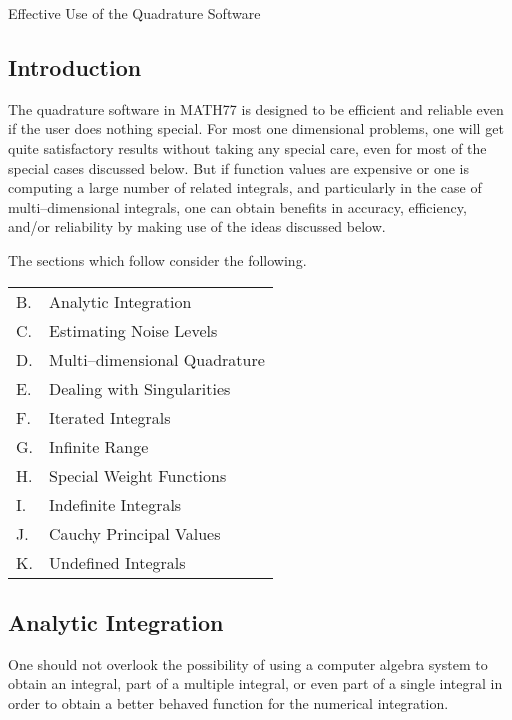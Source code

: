 \documentclass[twoside]{MATH77}
\begin{document}
 Effective Use of the Quadrature Software


\subsection{Introduction}

The quadrature software in MATH77 is designed to be efficient and
reliable even if the user does nothing special.  For most one
dimensional problems, one will get quite satisfactory results without
taking any special care, even for most of the special cases discussed
below.  But if function values are expensive or one is computing a
large number of related integrals, and particularly in the case of
multi--dimensional integrals, one can obtain benefits in accuracy,
efficiency, and/or reliability by making use of the ideas discussed
below.

The sections which follow consider the following.

\begin{tabular}{l@{~~}p{2.5in}}
B. & Analytic Integration \dotfill \pageref{analytic}\\
C. & Estimating Noise Levels \dotfill \pageref{noise}\\
D. & Multi--dimensional Quadrature \dotfill \pageref{multi_dim}\\
E. & Dealing with Singularities \dotfill \pageref{sing}\\
F. & Iterated Integrals \dotfill \pageref{iter}\\
G. & Infinite Range \dotfill \pageref{infinite}\\
H. & Special Weight Functions \dotfill \pageref{weight}\\
I. & Indefinite Integrals \dotfill \pageref{indefinite}\\
J. & Cauchy Principal Values \dotfill \pageref{cauchy}\\
K. & Undefined Integrals \dotfill \pageref{undefined}
\end{tabular}

\subsection{Analytic Integration}\label{analytic}
One should not overlook the possibility of using a computer algebra
system to obtain an integral, part of a multiple integral, or even
part of a single integral in order to obtain a better behaved
function for the numerical integration.
\end{document}
